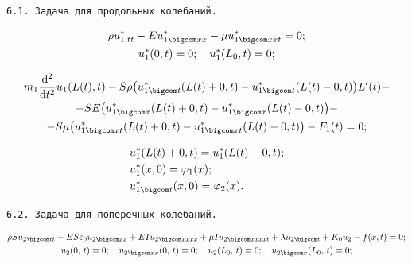 {\tt 6.1. Задача для продольных колебаний.}

\begin{gather}

\rho u_{1,tt}^{*}-Eu_{1 \bigcom xx}^{*}-\mu u_{1 \bigcom xxt}^{*}=0;\\

u_1^{*}(0, t)=0;\quad u_1^{*}(L_0, t)=0;

\end{gather}

\begin{multline}

m_1\frac{\mathrm{d}^2 }{\mathrm{d}t^2} u_1( L(t), t ) -

S\rho\bigl(u_{1 \bigcom t}^{*}(L(t)+0, t)-u_{1 \bigcom t}^{*}(L(t)-0, t)\bigr)L'(t)-\\

-SE\bigl(u_{1 \bigcom x}^{*}(L(t)+0, t)-u_{1 \bigcom x}^{*}(L(t)-0, t)\bigr)-\\

-S\mu\bigl(u_{1 \bigcom  xt}^{*}(L(t)+0, t)-u_{1 \bigcom  xt}^{*}(L(t)-0, t)\bigr)-F_1(t)=0;

\end{multline}

\begin{equation}

\begin{split}

& u_1^{*}(L(t)+0, t)=u_1^{*}(L(t)-0, t);\\

& u_1^{*}(x, 0)=\varphi_1(x);\\

& u_{1 \bigcom t}^{*}(x, 0)=\varphi_2(x).

 \end{split}

\end{equation}









{\tt 6.2. Задача для поперечных колебаний.}

\begin{gather} 

\rho Su_{2 \bigcom tt}-ES\varepsilon_0u_{2 \bigcom xx}+EIu_{2 \bigcom xxxx}+\mu Iu_{2 \bigcom xxxxt}+\lambda u_{2 \bigcom t}+K_0u_2-f( x,  t )=0;\\

u_2(0,\,t)=0;\quad u_{2 \bigcom xx}(0,\,t)=0;\quad u_2(L_0,\,t)=0;\quad u_{2 \bigcom x}(L_0,\,t)=0;

\end{gather}



